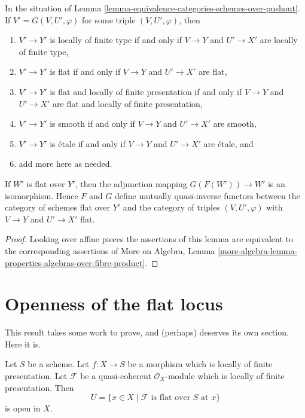 \begin{lemma}
\label{lemma-equivalence-categories-schemes-over-pushout-flat}
In the situation of
Lemma \ref{lemma-equivalence-categories-schemes-over-pushout}.
If $V' = G(V, U', \varphi)$ for some triple $(V, U', \varphi)$, then
\begin{enumerate}
\item $V' \to Y'$ is locally of finite type if and only if $V \to Y$ and
$U' \to X'$ are locally of finite type,
\item $V' \to Y'$ is flat if and only if $V \to Y$ and $U' \to X'$ are flat,
\item $V' \to Y'$ is flat and locally of finite presentation if and only if
$V \to Y$ and $U' \to X'$ are flat and locally of finite presentation,
\item $V' \to Y'$ is smooth if and only if $V \to Y$ and $U' \to X'$ are smooth,
\item $V' \to Y'$ is \'etale if and only if $V \to Y$ and $U' \to X'$
are \'etale, and
\item add more here as needed.
\end{enumerate}
If $W'$ is flat over $Y'$, then the adjunction mapping
$G(F(W')) \to W'$ is an isomorphism. Hence $F$ and $G$ define mutually
quasi-inverse functors between the category of schemes flat over $Y'$
and the category of triples $(V, U', \varphi)$ with $V \to Y$
and $U' \to X'$ flat.
\end{lemma}

\begin{proof}
Looking over affine pieces the assertions of this lemma
are equivalent to the corresponding assertions of
More on Algebra, Lemma
\ref{more-algebra-lemma-properties-algebras-over-fibre-product}.
\end{proof}







\section{Openness of the flat locus}
\label{section-open-flat}

\noindent
This result takes some work to prove, and (perhaps)
deserves its own section. Here it is.

\begin{theorem}
\label{theorem-openness-flatness}
Let $S$ be a scheme.
Let $f : X \to S$ be a morphism which is locally of finite presentation.
Let $\mathcal{F}$ be a quasi-coherent $\mathcal{O}_X$-module which is
locally of finite presentation. Then
$$
U = \{x \in X \mid \mathcal{F}\text{ is flat over }S\text{ at }x\}
$$
is open in $X$.
\end{theorem}

